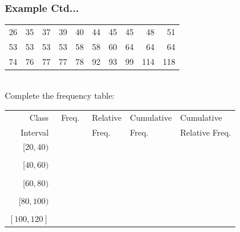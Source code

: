 \documentclass[xcolor=svgnames, compress]{beamer}
\begin{document}
\begin{frame} [t]
\frametitle{Example Ctd...}

\vspace{-0.5cm}

\begin{center}
\begin{tabular}{r r r r r r r r r r  }
26	&	35	&	37	&	39	&	40	&	44	&	45	&	45	&	48	&	51	\\
53	&	53	&	53	&	53	&	58	&	58	&	60	&	64	&	64	&	64	\\
74  	&	76	&	77	&	77	&	78	&	92	&	93	&	99	&	114	&	118	\\
\end{tabular}
\end{center}
\hfill\\
Complete the frequency table: 
\hfill\\


\scriptsize

\begin{center}
\begin{tabular}{r c l l l}
Class \hspace{0.25cm}	&	~Freq.~	&	\hspace{0.30cm} Relative \hspace{0.30cm}	&	\hspace{0.30cm} Cumulative \hspace{0.30cm}	&	\hspace{0.30cm} Cumulative	\\
Interval			 	&			&	\hspace{0.30cm} Freq.					&	\hspace{0.30cm} Freq.					&	\hspace{0.30cm} Relative Freq. \hspace{0.30cm} \\
\hline
$[20,40)$			&	\\
\hfill\\
$[40,60)$ 			&	\\
\hfill\\
$[60,80)$			&	\\
\hfill\\
$[80,100)$		&	\\
\hfill\\
$[100,120]$ 		&	\\
\hline
\end{tabular}
\end{center}

\end{frame}
\end{document}
